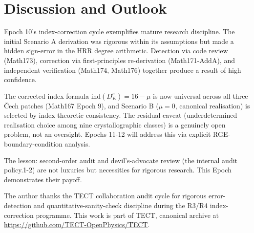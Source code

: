 \section{Discussion and Outlook}
Epoch 10's index-correction cycle exemplifies mature research discipline.
The initial Scenario A derivation was rigorous within its assumptions but made a
hidden sign-error in the HRR degree arithmetic. Detection via code review
(Math173), correction via first-principles re-derivation (Math171-AddA), and
independent verification (Math174, Math176) together produce a result of high
confidence.

The corrected index formula $\mathrm{ind}(D_E^c) = 16 - \mu$ is now universal across
all three Čech patches (Math167 Epoch 9), and Scenario B ($\mu = 0$, canonical
realisation) is selected by index-theoretic consistency. The residual caveat
(underdetermined realisation choice among nine crystallographic classes) is a
genuinely open problem, not an oversight. Epochs 11-12 will address this via
explicit RGE-boundary-condition analysis.

The lesson: second-order audit and devil's-advocate review (the internal audit policy.1-2)
are not luxuries but necessities for rigorous research. This Epoch
demonstrates their payoff.

\begin{acknowledgments}
The author thanks the TECT collaboration audit cycle for rigorous
error-detection and quantitative-sanity-check discipline during the
R3/R4 index-correction programme. This work is part of TECT, canonical archive at
\url{https://github.com/TECT-OpenPhysics/TECT}.
\end{acknowledgments}





